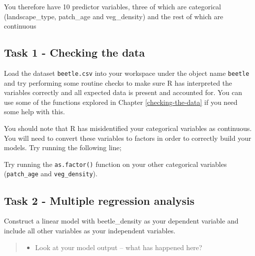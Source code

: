 \documentclass[
]{book}
\newenvironment{Shaded}{\begin{snugshade}}{\end{snugshade}}
\newcommand{\CommentTok}[1]{\textcolor[rgb]{0.56,0.35,0.01}{\textit{#1}}}
\newcommand{\FunctionTok}[1]{\textcolor[rgb]{0.13,0.29,0.53}{\textbf{#1}}}
\newcommand{\NormalTok}[1]{#1}
\newcommand{\OtherTok}[1]{\textcolor[rgb]{0.56,0.35,0.01}{#1}}
\newcommand{\SpecialCharTok}[1]{\textcolor[rgb]{0.81,0.36,0.00}{\textbf{#1}}}
\providecommand{\tightlist}{%
  \setlength{\itemsep}{0pt}\setlength{\parskip}{0pt}}
\begin{document}
You therefore have 10 predictor variables, three of which are categorical (landscape\_type, patch\_age and veg\_density) and the rest of which are continuous

\hypertarget{c11t1}{%
\subsection{Task 1 - Checking the data}\label{c11t1}}

Load the dataset \texttt{beetle.csv} into your workspace under the object name \texttt{beetle} and try performing some routine checks to make sure R has interpreted the variables correctly and all expected data is present and accounted for. You can use some of the functions explored in Chapter \ref{checking-the-data} if you need some help with this.

You should note that R has misidentified your categorical variables as continuous. You will need to convert these variables to factors in order to correctly build your models. Try running the following line;

\begin{Shaded}
\end{Shaded}

Try running the \texttt{as.factor()} function on your other categorical variables (\texttt{patch\_age} and \texttt{veg\_density}).

\hypertarget{task-2---multiple-regression-analysis}{%
\subsection{Task 2 - Multiple regression analysis}\label{task-2---multiple-regression-analysis}}

Construct a linear model with beetle\_density as your dependent variable and include all other variables as your independent variables.

\begin{quote}
\begin{itemize}
\tightlist
\item
  Look at your model output -- what has happened here?
\end{itemize}
\end{quote}
\end{document}
